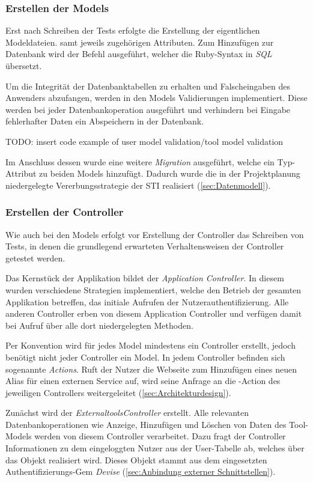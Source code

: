 \subsubsection{Erstellen der Models}
\label{sec:Erstellen der Models}
Erst nach Schreiben der Tests erfolgte die Erstellung der eigentlichen Modeldateien. samt jeweils
zugehörigen Attributen. Zum Hinzufügen zur Datenbank wird der Befehl  ausgeführt, welcher
die Ruby-Syntax in \textit{\acs{SQL}} übersetzt.

Um die Integrität der Datenbanktabellen zu erhalten und \ggfs Falscheingaben des Anwenders abzufangen,
werden in den Models Validierungen implementiert. Diese werden bei jeder Datenbankoperation
ausgeführt und verhindern bei Eingabe fehlerhafter Daten ein Abspeichern in der Datenbank.

TODO: insert code example of user model validation/tool model validation

Im Anschluss dessen wurde eine weitere \textit{Migration} ausgeführt, welche ein Typ-Attribut zu
beiden Models hinzufügt. Dadurch wurde die in der Projektplanung niedergelegte Vererbungsstrategie
der \acs{STI} realisiert (\Vgl \ref{sec:Datenmodell}).

\subsubsection{Erstellen der Controller}
\label{sec:Erstellen der Controller}
Wie auch bei den Models erfolgt vor Erstellung der Controller das Schreiben von Tests, in denen die
grundlegend erwarteten Verhaltensweisen der Controller getestet werden.

Das Kernstück der Applikation bildet der \textit{Application Controller}. In diesem wurden
verschiedene Strategien implementiert, welche den Betrieb der gesamten Applikation betreffen,
\bspw das initiale Aufrufen der Nutzerauthentifizierung. Alle anderen Controller erben von diesem
Application Controller und verfügen damit bei Aufruf über alle dort niedergelegten Methoden.

Per Konvention wird für jedes Model mindestens ein Controller erstellt, jedoch benötigt nicht jeder
Controller ein Model. In jedem Controller befinden sich sogenannte \textit{Actions}. Ruft der Nutzer \bspw die Webseite
zum Hinzufügen eines neuen Alias für einen externen Service auf, wird seine Anfrage an die
-Action des jeweiligen Controllers weitergeleitet (\Vgl \ref{sec:Architekturdesign}).

Zunächst wird der \textit{ExternaltoolsController} erstellt. Alle relevanten Datenbankoperationen
wie Anzeige, Hinzufügen und Löschen von Daten des Tool-Models werden von diesem Controller
verarbeitet. Dazu fragt der Controller Informationen zu dem eingeloggten Nutzer aus der User-Tabelle
ab, welches über das Objekt  realisiert wird. Dieses Objekt stammt aus dem
eingesetzten Authentifizierungs-Gem \textit{Devise} (\Vgl \ref{sec:Anbindung externer Schnittstellen}).

